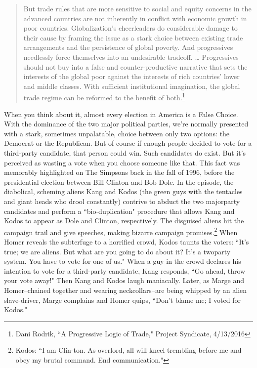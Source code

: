 \begin{quote}But trade rules that are more sensitive to social and equity concerns in the advanced
countries are not inherently in conflict with economic growth in poor countries.
Globalization's cheerleaders do considerable damage to their cause by framing the issue as
a stark choice between existing trade arrangements and the persistence of global poverty.
And progressives needlessly force themselves into an undesirable tradeoff.
… Progressives should not buy into a false and counter-productive narrative that sets the
interests of the global poor against the interests of rich countries' lower and middle classes.
With sufficient institutional imagination, the global trade regime can be reformed to the
benefit of both.\footnote{Dani Rodrik, ``A Progressive Logic of Trade," Project Syndicate, 4/13/2016}
\end{quote}

When you think about it, almost every election in America is a False Choice. With the dominance of the two major political parties, we're normally presented with a stark, sometimes 
unpalatable, choice between only two options: the Democrat or the Republican. But of course if enough people decided to vote for a third-party candidate, that person could win. Such 
candidates do exist. But it's perceived as wasting a vote when you choose someone like that. This fact was memorably highlighted on The Simpsons back in the fall of 1996, before the 
presidential election between Bill Clinton and Bob Dole. In the episode, the diabolical, scheming aliens Kang and Kodos (the green guys with the tentacles and giant heads who drool 
constantly) contrive to abduct the two majorparty candidates and perform a ``bio-duplication" procedure that allows Kang and Kodos to appear as Dole and Clinton, respectively. The 
disguised aliens hit the campaign trail and give speeches, making bizarre campaign 
promises.\footnote{Kodos: ``I am Clin-ton. As overlord, all will kneel trembling before me and obey my brutal command. End
communication."} 
When Homer reveals the subterfuge to a horrified crowd, Kodos taunts the voters: ``It's 
true; we are aliens. But what are you going to do about it? It's a twoparty system. You have to vote for one of us." When a guy in the crowd declares his intention to vote for a 
third-party candidate, Kang responds, ``Go ahead, throw your vote away!" Then Kang and Kodos laugh maniacally. Later, as Marge and Homer--chained together and wearing neckcollars--are 
being whipped by an alien slave-driver, Marge complains and Homer quips, ``Don't blame me; I voted for Kodos."

